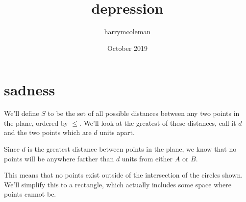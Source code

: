 \documentclass[12pt]{article}
\title{depression}
\author{harrymcoleman }
\date{October 2019}
\begin{document}
\maketitle

\section*{sadness}
We'll define $S$ to be the set of all possible distances between any two points in the plane, ordered by $\leq$. We'll look at the greatest of these distances, call it $d$ and the two points which are $d$ units apart.

\begin{center}
\end{center}

Since $d$ is the greatest distance between points in the plane, we know that no points will be anywhere farther than $d$ units from either $A$ or $B$.

\begin{center}
\end{center}

This means that no points exist outside of the intersection of the circles shown. We'll simplify this to a rectangle, which actually includes some space where points cannot be.
\end{document}
